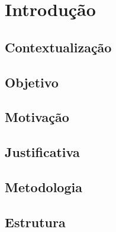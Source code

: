\chapter{Introdução}
\section{Contextualização}
\section{Objetivo}
\section{Motivação}
\section{Justificativa}
\section{Metodologia}
\section{Estrutura}